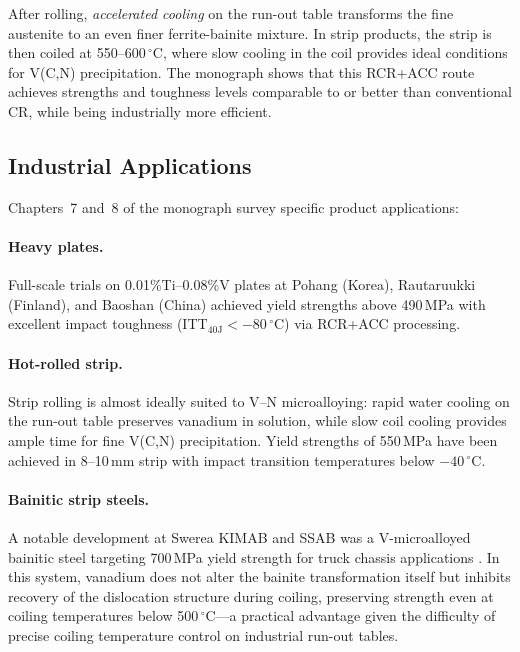 \documentclass[11pt,a4paper]{article}
\begin{document}
After rolling, \emph{accelerated cooling} on the run-out table transforms
the fine austenite to an even finer ferrite-bainite mixture.  In strip
products, the strip is then coiled at 550--600\,${}^\circ$C, where slow
cooling in the coil provides ideal conditions for V(C,N) precipitation.
The monograph shows that this RCR+ACC route achieves strengths and
toughness levels comparable to or better than conventional CR, while
being industrially more efficient.

\subsection{Industrial Applications}

Chapters~7 and~8 of the monograph survey specific product applications:

\paragraph{Heavy plates.}  Full-scale trials on 0.01\%Ti--0.08\%V plates
at Pohang (Korea), Rautaruukki (Finland), and Baoshan (China) achieved
yield strengths above 490\,MPa with excellent impact toughness
(ITT$_{40\text{J}} < -80\,{}^\circ$C) via RCR+ACC processing.

\paragraph{Hot-rolled strip.}  Strip rolling is almost ideally suited to
V--N microalloying: rapid water cooling on the run-out table preserves
vanadium in solution, while slow coil cooling provides ample time for
fine V(C,N) precipitation.  Yield strengths of 550\,MPa have been
achieved in 8--10\,mm strip with impact transition temperatures below
$-40\,{}^\circ$C.

\paragraph{Bainitic strip steels.}  A notable development at Swerea KIMAB
and SSAB was a V-microalloyed bainitic steel targeting 700\,MPa yield
strength for truck chassis applications \cite{Hutchinson2014Bainite}.  In
this system, vanadium does not alter the bainite transformation itself
but inhibits recovery of the dislocation structure during coiling,
preserving strength even at coiling temperatures below
500\,${}^\circ$C---a practical advantage given the difficulty of precise
coiling temperature control on industrial run-out tables.
\end{document}
